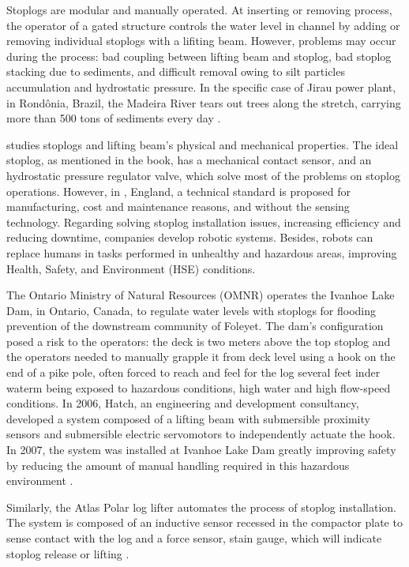 Stoplogs are modular and manually operated. At inserting or removing process,
the operator of a gated structure controls the water
level in channel by adding or removing individual stoplogs with a lifiting beam.
However, problems may occur during the process: bad coupling between lifting
beam and stoplog, bad stoplog stacking due to sediments, and difficult removal
owing to silt particles accumulation and hydrostatic pressure. In the specific
case of Jirau power plant, in Rond{\^o}nia, Brazil, the Madeira River tears out
trees along the stretch, carrying more than 500 tons of sediments every day
\citep{amazon}.

\citet{jack} studies stoplogs and lifting beam's physical and
mechanical properties. The ideal stoplog, as mentioned in the book, has a
mechanical contact sensor, and an hydrostatic pressure regulator valve, which
solve most of the problems on stoplog operations. However, in \cite{pinc},
England, a technical standard is proposed for
manufacturing, cost and maintenance reasons, and without the sensing technology.
Regarding solving stoplog installation issues, increasing efficiency and
reducing downtime, companies develop robotic systems. Besides, robots can replace humans in tasks
performed in unhealthy and hazardous areas, improving Health,
Safety, and Environment (HSE) conditions.

The Ontario Ministry of Natural Resources (OMNR) operates the Ivanhoe Lake Dam,
in Ontario, Canada, to regulate water levels with stoplogs for flooding
prevention of the downstream community of Foleyet. The dam's
configuration posed a risk to the operators: the deck is two meters above the
top stoplog and the operators needed to
manually grapple it from deck level using a hook on the end of
a pike pole, often forced to reach and feel for the log several feet inder
waterm being exposed to hazardous conditions, high water and high flow-speed
conditions. In 2006, Hatch, an engineering and development consultancy,
developed a system composed of a lifting beam with submersible proximity sensors
and submersible electric servomotors to independently actuate the hook. In 2007,
the system was installed at Ivanhoe Lake Dam greatly improving safety by
reducing the amount of manual handling required in this hazardous environment
\citep{hatch}.

Similarly, the Atlas Polar log lifter automates the process of stoplog
installation. The system is composed of an inductive sensor
recessed in the compactor plate to sense contact with the log and a force
sensor, stain gauge, which will indicate stoplog release or lifting
\citep{atlas}.



